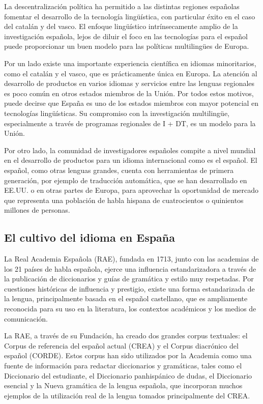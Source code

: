 \begin{multicols}{2}
La descentralización política ha permitido a las distintas regiones españolas fomentar el desarrollo de la tecnología lingüística, con particular éxito en el caso del catalán y del vasco. El enfoque lingüístico intrínsecamente amplio de la investigación española, lejos de diluir el foco en las tecnologías para el español puede proporcionar un buen modelo para las políticas multilingües de Europa.

Por un lado existe una importante experiencia científica en  idiomas minoritarios, como el catalán y el vasco, que es prácticamente única en Europa. La atención al desarrollo de productos en varios idiomas y servicios entre las lenguas regionales es poco común en otros estados miembros de la Unión. Por todos estos motivos, puede decirse que España es uno de los estados miembros con mayor potencial en tecnologías lingüísticas. Su compromiso con la investigación multilingüe, especialmente a través de programas regionales de I + DT, es un modelo para la Unión.

Por otro lado, la comunidad de investigadores  españoles compite a nivel mundial en el desarrollo de productos para un idioma internacional como es el español. El español, como otras lenguas grandes, cuenta con herramientas de primera generación, por ejemplo de traducción automática, que se han desarrollado en  EE.UU. o en otras partes de Europa, para aprovechar la oportunidad de mercado que representa  una población de habla hispana de cuatrocientos o quinientos millones de personas.

\subsection{El cultivo del idioma en España}


La Real Academia Española (RAE), fundada en 1713, junto con las academias de los 21 países de habla española, ejerce una influencia estandarizadora a través de la publicación de diccionarios y guías de gramática y estilo muy respetadas. Por cuestiones históricas de influencia y prestigio, existe una forma estandarizada de la lengua, principalmente basada en el español castellano, que es ampliamente reconocida para su uso en la literatura, los contextos académicos y los medios de comunicación.

La RAE, a través de su Fundación, ha creado dos grandes corpus textuales: el Corpus de referencia del español actual (CREA) y el Corpus diacrónico del español (CORDE). Estos corpus han sido utilizados por la Academia como una fuente de información para redactar diccionarios y gramáticas, tales como el Diccionario del estudiante, el Diccionario panhispánico de dudas, el Diccionario esencial y la Nueva gramática de la lengua española, que incorporan muchos ejemplos de la utilización real de la lengua tomados principalmente del CREA.


\end{multicols}
